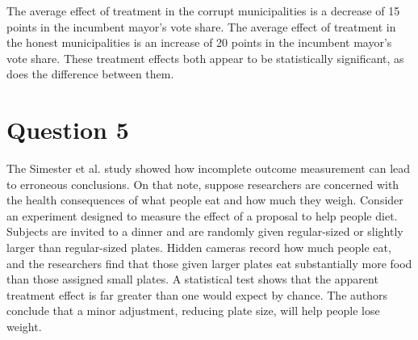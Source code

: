 \documentclass[11pt,notitlepage]{article}\usepackage[]{graphicx}\usepackage[]{color}
\begin{document}
The average effect of treatment in the corrupt municipalities is a decrease of 15 points in the incumbent mayor's vote share. The average effect of treatment in the honest municipalities is an increase of 20 points in the incumbent mayor's vote share. These treatment effects both appear to be statistically significant, as does the difference between them.

\section*{Question 5}
The Simester et al. study showed how incomplete outcome measurement can lead to erroneous conclusions. On that note, suppose researchers are concerned with the health consequences of what people eat and how much they weigh. Consider an experiment designed to measure the effect of a proposal to help people diet. Subjects are invited to a dinner and are randomly given regular-sized or slightly larger than regular-sized plates. Hidden cameras record how much people eat, and the researchers find that those given larger plates eat substantially more food than those assigned small plates. A statistical test shows that the apparent treatment effect is far greater than one would expect by chance. The authors conclude that a minor adjustment, reducing plate size, will help people lose weight.
\end{document}
